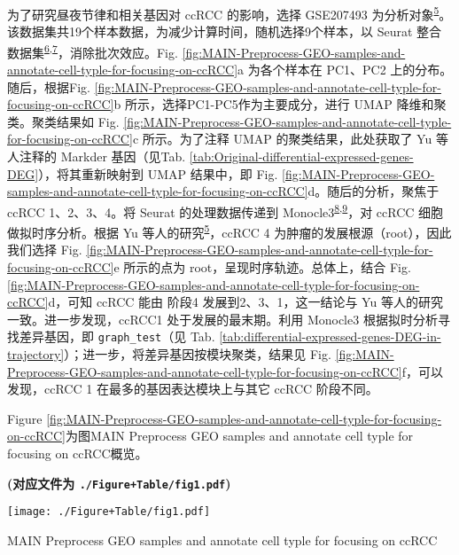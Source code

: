 \documentclass[
]{article}
\begin{document}
为了研究昼夜节律和相关基因对 ccRCC 的影响，选择 GSE207493 为分析对象\textsuperscript{\protect\hyperlink{ref-IntegrativeSinYuZh2023}{5}}。该数据集共19个样本数据，为减少计算时间，随机选择9个样本，以 Seurat 整合数据集\textsuperscript{\protect\hyperlink{ref-IntegratedAnalHaoY2021}{6},\protect\hyperlink{ref-ComprehensiveIStuart2019}{7}}，消除批次效应。Fig. \ref{fig:MAIN-Preprocess-GEO-samples-and-annotate-cell-typle-for-focusing-on-ccRCC}a 为各个样本在 PC1、PC2 上的分布。随后，根据Fig. \ref{fig:MAIN-Preprocess-GEO-samples-and-annotate-cell-typle-for-focusing-on-ccRCC}b 所示，选择PC1-PC5作为主要成分，进行 UMAP 降维和聚类。聚类结果如 Fig. \ref{fig:MAIN-Preprocess-GEO-samples-and-annotate-cell-typle-for-focusing-on-ccRCC}c 所示。为了注释 UMAP 的聚类结果，此处获取了 Yu 等人注释的 Markder 基因（见Tab. \ref{tab:Original-differential-expressed-genes-DEG}），将其重新映射到 UMAP 结果中，即 Fig. \ref{fig:MAIN-Preprocess-GEO-samples-and-annotate-cell-typle-for-focusing-on-ccRCC}d。随后的分析，聚焦于 ccRCC 1、2、3、4。将 Seurat 的处理数据传递到 Monocle3\textsuperscript{\protect\hyperlink{ref-ReversedGraphQiuX2017}{8},\protect\hyperlink{ref-TheDynamicsAnTrapne2014}{9}}，对 ccRCC 细胞做拟时序分析。根据 Yu 等人的研究\textsuperscript{\protect\hyperlink{ref-IntegrativeSinYuZh2023}{5}}，ccRCC 4 为肿瘤的发展根源（root），因此我们选择 Fig. \ref{fig:MAIN-Preprocess-GEO-samples-and-annotate-cell-typle-for-focusing-on-ccRCC}e 所示的点为 root，呈现时序轨迹。总体上，结合 Fig. \ref{fig:MAIN-Preprocess-GEO-samples-and-annotate-cell-typle-for-focusing-on-ccRCC}d，可知 ccRCC 能由 阶段4 发展到2、3、1，这一结论与 Yu 等人的研究一致。进一步发现，ccRCC1 处于发展的最末期。利用 Monocle3 根据拟时分析寻找差异基因，即 \texttt{graph\_test}（见 Tab. \ref{tab:differential-expressed-genes-DEG-in-trajectory}）；进一步，将差异基因按模块聚类，结果见 Fig. \ref{fig:MAIN-Preprocess-GEO-samples-and-annotate-cell-typle-for-focusing-on-ccRCC}f，可以发现，ccRCC 1 在最多的基因表达模块上与其它 ccRCC 阶段不同。

Figure \ref{fig:MAIN-Preprocess-GEO-samples-and-annotate-cell-typle-for-focusing-on-ccRCC}为图MAIN Preprocess GEO samples and annotate cell typle for focusing on ccRCC概览。

\textbf{(对应文件为 \texttt{./Figure+Table/fig1.pdf})}

\def\@captype{figure}
\begin{center}
\texttt{[image: ./Figure+Table/fig1.pdf]}
\caption{MAIN Preprocess GEO samples and annotate cell typle for focusing on ccRCC}\label{fig:MAIN-Preprocess-GEO-samples-and-annotate-cell-typle-for-focusing-on-ccRCC}
\end{center}
\end{document}
